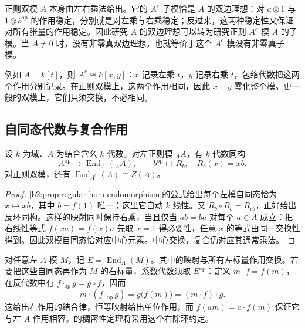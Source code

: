 正则双模 \(A\) 本身由左右乘法给出。它的 \(A^e\) 子模恰是 \(A\) 的双边理想：对 \(a\otimes1\) 与 \(1\otimes b^{\mathrm{op}}\) 的作用稳定，分别就是对左乘与右乘稳定；反过来，这两种稳定性又保证对所有张量的作用稳定。因此研究 \(A\) 的双边理想可以转为研究正则 \(A^e\) 模 \(A\) 的子模。当 \(A\ne0\) 时，没有非零真双边理想，也就等价于这个 \(A^e\) 模没有非零真子模。

\ProseParagraphBreak
例如 \(A=k[t]\)，则 \(A^e\cong k[x,y]\)：\(x\) 记录左乘 \(t\)，\(y\) 记录右乘 \(t\)，包络代数把这两个作用分别记录。在正则双模上，这两个作用相同，因此 \(x-y\) 零化整个模。更一般的双模上，它们只须交换，不必相同。

\subsection{自同态代数与复合作用}
\label{b2:subsec:1102:03}

\begin{proposition}\label{b2:prop:regular-bimodule-endomorphism}
	设 \(k\) 为域、\(A\) 为结合含幺 \(k\) 代数。对左正则模 \({}_AA\)，有 \(k\) 代数同构
	\[
		A^{\mathrm{op}}\longrightarrow\operatorname{End}_A({}_AA),\qquad b^{\mathrm{op}}\longmapsto R_b, \quad R_b(x)=xb.
	\]
	对正则双模，还有 \(\operatorname{End}_{A^e}(A)\cong Z(A)\)。
\end{proposition}
\begin{proof}
	\cref{b2:prop:regular-hom-endomorphism}的公式给出每个左模自同态恰为 \(x\mapsto xb\)，其中 \(b=f(1)\) 唯一；这里它自动 \(k\) 线性。又 \(R_b\circ R_c=R_{cb}\)，正好给出反环同构。这样的映射同时保持右乘，当且仅当 \(ab=ba\) 对每个 \(a\in A\) 成立：把右线性等式 \(f(xa)=f(x)a\) 先取 \(x=1\) 得必要性，任意 \(x\) 的等式由同一交换性得到。因此双模自同态恰对应中心元素。中心交换，复合仍对应其通常乘法。
\end{proof}

对任意左 \(A\) 模 \(M\)，记 \(E=\operatorname{End}_A(M)\)。其中的映射与所有左标量作用交换。若要把这些自同态再作为 \(M\) 的右标量，系数代数须取 \(E^{\mathrm{op}}\)：定义 \(m\cdot f=f(m)\)，在反代数中有 \(f\cdot_{\mathrm{op}}g=g\circ f\)，因而
\[
	m\cdot(f\cdot_{\mathrm{op}}g) =g\bigl(f(m)\bigr)=(m\cdot f)\cdot g.
\]
这给出右作用的结合律，恒等映射给出单位作用，而 \(f(am)=a\cdot f(m)\) 保证它与左 \(A\) 作用相容。的稠密性定理将采用这个右除环约定。

